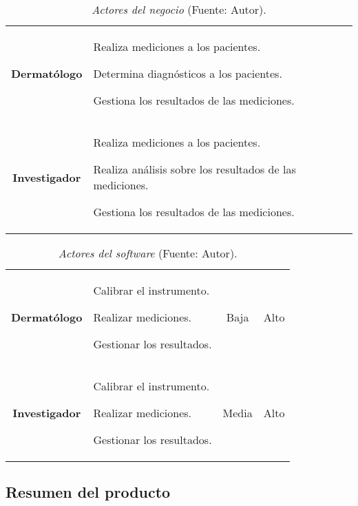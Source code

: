 		\begin{table}[h]
		\small
		\caption[Actores del negocio]{\textit{Actores del negocio} (Fuente: Autor).}
		\centering
		\setlength{\extrarowheight}{\altocelda}
		\begin{tabulary}{\anchotabla}{|c|J|}
			\hline
			 & \\ \hline
			\textbf{Dermat\'{o}logo} & 
			Realiza mediciones a los pacientes.
			
			Determina diagn\'{o}sticos a los pacientes.
			
			Gestiona los resultados de las mediciones.
		\\ \hline
			\textbf{Investigador} &
			Realiza mediciones a los pacientes.
			
			Realiza an\'{a}lisis sobre los resultados de las mediciones.
			
			Gestiona los resultados de las mediciones.\\ \hline
		\end{tabulary}
	\end{table}
	
	\begin{table}[h]
		\small
		\caption[Actores del software]{\textit{Actores del software} (Fuente: Autor).}
		\centering
		\setlength{\extrarowheight}{\altocelda}
		\begin{tabulary}{\anchotabla}{|c|L|c|c|}
			\hline
			 &  &  & \\ \hline
			\textbf{Dermat\'{o}logo} &
			Calibrar el instrumento.
			
			Realizar mediciones.
			
			Gestionar los resultados. &
			Baja &
			Alto\\ \hline
			
			\textbf{Investigador} &
			Calibrar el instrumento.
			
			Realizar mediciones.
			
			Gestionar los resultados. &
			Media &
			Alto\\ \hline
		\end{tabulary}
	\end{table}
	
	\subsection{Resumen del producto}
	
